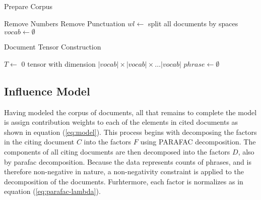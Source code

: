 \documentclass{article}
\begin{document}
\begin{algorithm}
\caption{Prepare Corpus}
\label{algcorp}
    Remove Numbers\;
    Remove Punctuation\;
    $wl \leftarrow $ split all documents by spaces\;
    $vocab \leftarrow \emptyset$\;
     {
    }
\end{algorithm}


\begin{algorithm}
\caption{Document Tensor Construction}
\label{algdoc}
    $T \leftarrow$ 0 tensor with dimension $|vocab| \times |vocab| \times \ldots
    |vocab|$\;
    $phrase \leftarrow \emptyset$ \;
\end{algorithm}


\subsection{Influence Model}
Having modeled the corpus of documents, all that remains to complete
the model is assign contribution weights to each of the elements in
cited documents as shown in equation (\ref{eq:model}).   This process
begins with decomposing the factors in the citing document $C$ into
the factors $F$ using PARAFAC decomposition.  The components of all
citing documents are then decomposed into the factors $D$, also by
parafac decomposition. Because the data represents counts of phrases,
and is therefore non-negative in nature, a non-negativity constraint
is applied to the decomposition of the documents. Furhtermore, each
factor is normalizes as in equation (\ref{eq:parafac-lambda}).
\end{document}
